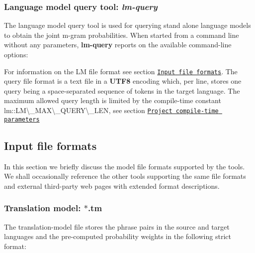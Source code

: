 \subsubsection*{Language model query tool\+: {\itshape lm-\/query}}

The language model query tool is used for querying stand alone language models to obtain the joint m-\/gram probabilities. When started from a command line without any parameters, {\bfseries lm-\/query} reports on the available command-\/line options\+:


 For information on the L\+M file format see section \href{#input-file-formats}{\tt Input file formats}. The query file format is a text file in a {\bfseries U\+T\+F8} encoding which, per line, stores one query being a space-\/separated sequence of tokens in the target language. The maximum allowed query length is limited by the compile-\/time constant {\ttfamily lm\+::\+L\+M\textbackslash{}\+\_\+\+M\+A\+X\textbackslash{}\+\_\+\+Q\+U\+E\+R\+Y\textbackslash{}\+\_\+\+L\+E\+N}, see section \href{#project-compile-time-parameters}{\tt Project compile-\/time parameters}

\subsection*{Input file formats}

In this section we briefly discuss the model file formats supported by the tools. We shall occasionally reference the other tools supporting the same file formats and external third-\/party web pages with extended format descriptions.

\subsubsection*{Translation model\+: {\ttfamily $\ast$.tm}}

The translation-\/model file stores the phrase pairs in the source and target languages and the pre-\/computed probability weights in the following strict format\+:


